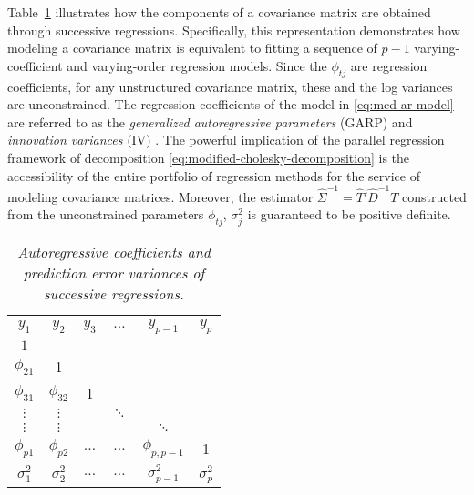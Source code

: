 Table~\ref{table:cholesky-decomposition-successive-regressions} illustrates how the components of a covariance matrix are obtained through successive regressions. Specifically, this representation demonstrates how modeling a covariance matrix is equivalent to fitting a sequence of $p - 1$ varying-coefficient and varying-order regression models. Since the $\phi_{tj}$ are regression coefficients, for any unstructured covariance matrix, these and the log variances are unconstrained. The regression coefficients of the model in \eqref{eq:mcd-ar-model} are referred to as the \textit{generalized autoregressive parameters} (GARP) and \textit{innovation variances} (IV) \citep{pourahmadi1999joint,pourahmadi2000maximum}. The powerful implication of the parallel regression framework of decomposition \eqref{eq:modified-cholesky-decomposition} is the accessibility of the entire portfolio of regression methods for the service of modeling covariance matrices. Moreover, the estimator $\hat{\Sigma}^{-1} = \hat{T}' \hat{D}^{-1} {T}$ constructed from the unconstrained parameters $\phi_{tj}$, $\sigma_j^2$ is guaranteed to be positive definite. 
\bigskip

\begin{table}[H]
\centering
\caption{\textit{Autoregressive coefficients and prediction error variances of successive regressions.}}
\begin{tabular}{cccccc}
 $y_{1}$&$y_{2}$ & $y_{3}$ & $\dots$ &$y_{p-1}$& $y_{p}$\\ \midrule
 $1$& &&&&\\
$\phi_{21}$& 1 &&&& \\
$\phi_{31}$& $\phi_{32}$& 1 &&& \\ 
$\vdots$ & $\vdots$ & & $\ddots$&& \\
$\vdots$ & $\vdots$ & && $\ddots$& \\
$\phi_{p1}$& $\phi_{p2}$&$\dots$ &$\dots$ &$\phi_{p,p-1}$ & 1\\ \midrule
$\sigma_1^2$ & $\sigma_2^2$ & $\dots$&$\dots$ &$\sigma_{p-1}^2$ &$\sigma_p^2$
\end{tabular} \label{table:cholesky-decomposition-successive-regressions}
\end{table}

